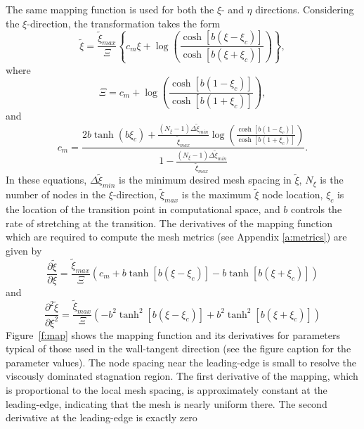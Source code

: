The same mapping function is used for both the $\xi$- and $\eta$ directions.
Considering the $\xi$-direction, the transformation takes the form
%
\begin{equation} \label{e:map}
\tilde\xi = \frac{\tilde\xi_{max}}{\Xi} \left\{
            c_m \xi + \log\left( \frac{\cosh[b(\xi-\xi_c)]}
                                      {\cosh[b(\xi+\xi_c)]} \right) \right\},
\end{equation}
%
where
%
\begin{equation}
  \Xi = c_m + \log\left( \frac{\cosh[b(1-\xi_c)]}
                              {\cosh[b(1+\xi_c)]} \right) ,
\end{equation}
%
and
%
\begin{equation} \label{e:cm}
c_m = \frac{ 2b\tanh(b\xi_c) +
             \frac{(N_\xi-1)\Delta\tilde\xi_{min}}{\tilde\xi_{max}} \log\left(
             \frac{\cosh[b(1-\xi_c)]}{\cosh[b(1+\xi_c)]} \right) } {1 -
             \frac{(N_\xi-1)\Delta\tilde\xi_{min}}{\tilde\xi_{max}}} .
\end{equation}
%
In these equations, $\Delta\tilde\xi_{min}$ is the minimum desired mesh
spacing in $\tilde\xi$, $N_\xi$ is the number of nodes in the $\xi$-direction,
$\tilde\xi_{max}$ is the maximum $\tilde\xi$ node location, $\xi_c$ is the
location of the transition point in computational space, and $b$ controls the
rate of stretching at the transition.  The derivatives of the mapping function
which are required to compute the mesh metrics (see Appendix \ref{a:metrics})
are given by
%
\begin{equation} \label{e:d1map}
\frac{\partial \tilde\xi}{\partial \xi} = \frac{\tilde\xi_{max}}{\Xi}
      \left( c_m + b\tanh[b(\xi-\xi_c)] - b\tanh[b(\xi+\xi_c)] \right)
\end{equation}
%
and
%
\begin{equation} \label{e:d2map}
\frac{\partial^2 \tilde\xi}{\partial \xi^2} = \frac{\tilde\xi_{max}}{\Xi}
      \left( -b^2\tanh^2[b(\xi-\xi_c)] + b^2\tanh^2[b(\xi+\xi_c)] \right)
\end{equation}
%
Figure~\ref{f:map} shows the mapping function and its derivatives for
parameters typical of those used in the wall-tangent direction (see the figure
caption for the parameter values).  The node spacing near the leading-edge is
small to resolve the viscously dominated stagnation region.  The first
derivative of the mapping, which is proportional to the local mesh spacing, is
approximately constant at the leading-edge, indicating that the mesh is nearly
uniform there.  The second derivative at the leading-edge is exactly zero
